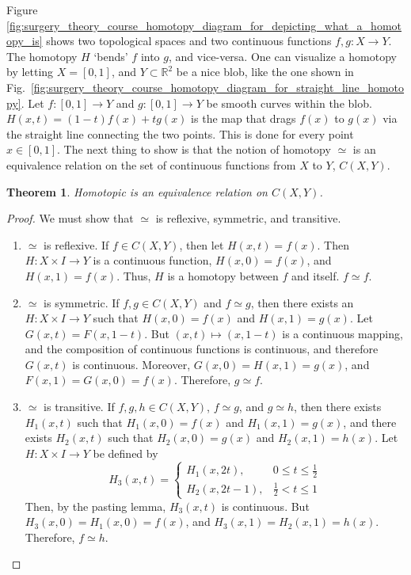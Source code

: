 \documentclass{article}
\theoremstyle{mystyle}
\newtheorem{theorem}{Theorem}[section]
\begin{document}
Figure \ref{fig:surgery_theory_course_homotopy_diagram_for_depicting_what_a_homotopy_is} shows two topological spaces and two continuous functions $f,g:X\rightarrow Y$. The homotopy $H$ `bends' $f$ into $g$, and vice-versa. One can visualize a homotopy by letting $X = [0,1]$, and $Y\subset \mathbb{R}^{2}$ be a nice blob, like the one shown in Fig.~\ref{fig:surgery_theory_course_homotopy_diagram_for_straight_line_homotopy}. Let $f:[0,1]\rightarrow Y$ and $g:[0,1]\rightarrow Y$ be smooth curves within the blob. $H(x,t) = (1-t)f(x)+tg(x)$ is the map that drags $f(x)$ to $g(x)$ via the straight line connecting the two points. This is done for every point $x\in [0,1]$. The next thing to show is that the notion of homotopy $\simeq$ is an equivalence relation on the set of continuous functions from $X$ to $Y$, $C(X,Y)$.
\begin{theorem}
Homotopic is an equivalence relation on $C(X,Y)$.
\end{theorem}
\begin{proof}
We must show that $\simeq$ is reflexive, symmetric, and transitive.
\begin{enumerate}
    \item $\simeq$ is reflexive. If $f\in C(X,Y)$, then let $H(x,t) = f(x)$. Then $H:X\times I \rightarrow Y$ is a continuous function, $H(x,0) = f(x)$, and $H(x,1) = f(x)$. Thus, $H$ is a homotopy between $f$ and itself. $f\simeq f$.
    \item $\simeq$ is symmetric. If $f,g\in C(X,Y)$ and $f\simeq g$, then there exists an $H:X\times I \rightarrow Y$ such that $H(x,0) = f(x)$ and $H(x,1) = g(x)$. Let $G(x,t) = F(x,1-t)$. But $(x,t)\mapsto (x,1-t)$ is a continuous mapping, and the composition of continuous functions is continuous, and therefore $G(x,t)$ is continuous. Moreover, $G(x,0) = H(x,1) = g(x)$, and $F(x,1) = G(x,0) = f(x)$. Therefore, $g\simeq f$.
    \item $\simeq$ is transitive. If $f,g,h\in C(X,Y)$, $f\simeq g$, and $g\simeq h$, then there exists $H_{1}(x,t)$ such that $H_{1}(x,0) = f(x)$ and $H_{1}(x,1) = g(x)$, and there exists $H_{2}(x,t)$ such that $H_{2}(x,0) = g(x)$ and $H_{2}(x,1) = h(x)$. Let $H:X\times I\rightarrow Y$ be defined by
    \begin{equation*}
        H_{3}(x,t) = \begin{cases} H_{1}(x,2t), & 0\leq t\leq \frac{1}{2}\\ H_{2}(x,2t-1), & \frac{1}{2}<t\leq 1 \end{cases}
    \end{equation*}
    Then, by the pasting lemma, $H_{3}(x,t)$ is continuous. But $H_{3}(x,0) = H_{1}(x,0) = f(x)$, and $H_{3}(x,1) = H_{2}(x,1) = h(x)$. Therefore, $f\simeq h$.
\end{enumerate}
\end{proof}
\end{document}
